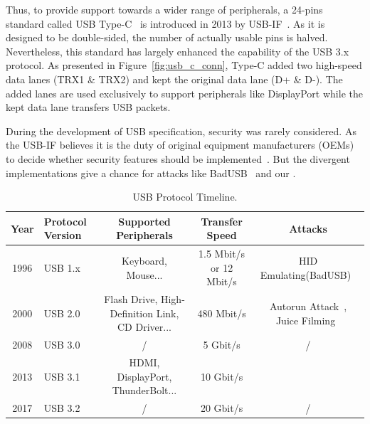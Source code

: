 Thus, to provide support towards a wider range of peripherals, a 24-pins
standard called USB Type-C~\cite{typec} is introduced in 2013 by USB-IF~\cite{usbif}. As it is designed to be double-sided, the number of actually usable
pins is halved. Nevertheless, this standard has largely enhanced the capability
of the USB 3.x protocol. As presented in Figure~\ref{fig:usb_c_conn}, Type-C added
two high-speed data lanes (TRX1 \& TRX2) and kept the original data lane (D+ \&
D-). The added lanes are used exclusively to support peripherals like
DisplayPort while the kept data lane transfers USB packets.

During the development of USB specification, security was rarely considered. As
the USB-IF believes it is the duty of original equipment manufacturers (OEMs)
to decide whether security features should be implemented~\cite{usbsec}. But the divergent implementations give a chance for attacks like
BadUSB~\cite{rubber} and our \tool.

\begin{table}
\begin{tabular}{|c|l|c|c|c|}
	\hline
	\textbf{Year} & \textbf{Protocol Version} & \textbf{Supported Peripherals} & \textbf{Transfer Speed} & \textbf{Attacks} \\
	\hline
	1996 & USB 1.x~\cite{usb10,usb11} & Keyboard, Mouse... & 1.5 Mbit/s or 12 Mbit/s & HID Emulating(BadUSB)~\cite{badusb} \\
	\hline
	2000 & USB 2.0~\cite{usb20} & Flash Drive, High-Definition Link, CD Driver... & 480 Mbit/s & Autorun Attack~\cite{duqu}, Juice Filming~\cite{JFC,JFCImpact} \\
	\hline
	2008 & USB 3.0~\cite{usb30} & / & 5 Gbit/s & / \\
	\hline
	2013 & USB 3.1~\cite{usb31} & HDMI, DisplayPort, ThunderBolt... & 10 Gbit/s & \tool \\
	\hline
	2017 & USB 3.2~\cite{usb32} & / & 20 Gbit/s & / \\
	\hline
\end{tabular}
	\linebreak
\caption{USB Protocol Timeline.}
\label{table:usb_timeline}
\end{table}
